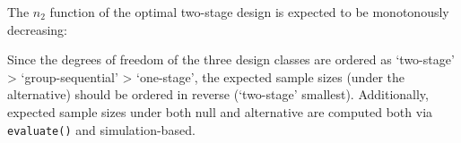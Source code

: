 \documentclass[
]{book}
\newenvironment{Shaded}{\begin{snugshade}}{\end{snugshade}}
\newcommand{\CommentTok}[1]{\textcolor[rgb]{0.56,0.35,0.01}{\textit{#1}}}
\newcommand{\DecValTok}[1]{\textcolor[rgb]{0.00,0.00,0.81}{#1}}
\newcommand{\KeywordTok}[1]{\textcolor[rgb]{0.13,0.29,0.53}{\textbf{#1}}}
\newcommand{\NormalTok}[1]{#1}
\newcommand{\OperatorTok}[1]{\textcolor[rgb]{0.81,0.36,0.00}{\textbf{#1}}}
\newcommand{\StringTok}[1]{\textcolor[rgb]{0.31,0.60,0.02}{#1}}
\begin{document}
The \(n_2\) function of the optimal two-stage design is expected to be
monotonously decreasing:

\begin{Shaded}
\end{Shaded}

Since the degrees of freedom of the three design classes are ordered as
`two-stage' \textgreater{} `group-sequential' \textgreater{} `one-stage',
the expected sample sizes (under the alternative) should be ordered
in reverse (`two-stage' smallest).
Additionally, expected sample sizes under both null and alternative
are computed both via \texttt{evaluate()} and simulation-based.
\end{document}
